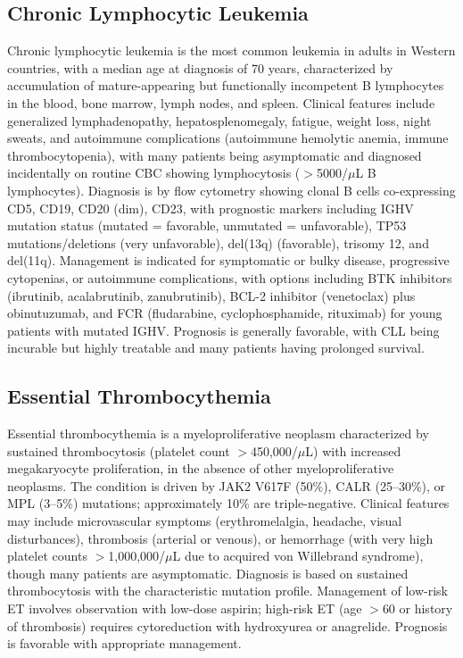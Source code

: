 \subsection{Chronic Lymphocytic Leukemia}
\label{sec:Chronic Lymphocytic Leukemia}
Chronic lymphocytic leukemia is the most common leukemia in adults in Western countries, with a median age at diagnosis of 70 years, characterized by accumulation of mature-appearing but functionally incompetent B lymphocytes in the blood, bone marrow, lymph nodes, and spleen. Clinical features include generalized lymphadenopathy, hepatosplenomegaly, fatigue, weight loss, night sweats, and autoimmune complications (autoimmune hemolytic anemia, immune thrombocytopenia), with many patients being asymptomatic and diagnosed incidentally on routine CBC showing lymphocytosis ($>$5000/$\mu$L B lymphocytes). Diagnosis is by flow cytometry showing clonal B cells co-expressing CD5, CD19, CD20 (dim), CD23, with prognostic markers including IGHV mutation status (mutated = favorable, unmutated = unfavorable), TP53 mutations/deletions (very unfavorable), del(13q) (favorable), trisomy 12, and del(11q). Management is indicated for symptomatic or bulky disease, progressive cytopenias, or autoimmune complications, with options including BTK inhibitors (ibrutinib, acalabrutinib, zanubrutinib), BCL-2 inhibitor (venetoclax) plus obinutuzumab, and FCR (fludarabine, cyclophosphamide, rituximab) for young patients with mutated IGHV. Prognosis is generally favorable, with CLL being incurable but highly treatable and many patients having prolonged survival.

\subsection{Essential Thrombocythemia}
\label{sec:Essential Thrombocythemia}
Essential thrombocythemia is a myeloproliferative neoplasm characterized by sustained thrombocytosis (platelet count $>$450,000/$\mu$L) with increased megakaryocyte proliferation, in the absence of other myeloproliferative neoplasms. The condition is driven by JAK2 V617F (50\%), CALR (25--30\%), or MPL (3--5\%) mutations; approximately 10\% are triple-negative. Clinical features may include microvascular symptoms (erythromelalgia, headache, visual disturbances), thrombosis (arterial or venous), or hemorrhage (with very high platelet counts $>$1,000,000/$\mu$L due to acquired von Willebrand syndrome), though many patients are asymptomatic. Diagnosis is based on sustained thrombocytosis with the characteristic mutation profile. Management of low-risk ET involves observation with low-dose aspirin; high-risk ET (age $>$60 or history of thrombosis) requires cytoreduction with hydroxyurea or anagrelide. Prognosis is favorable with appropriate management.

